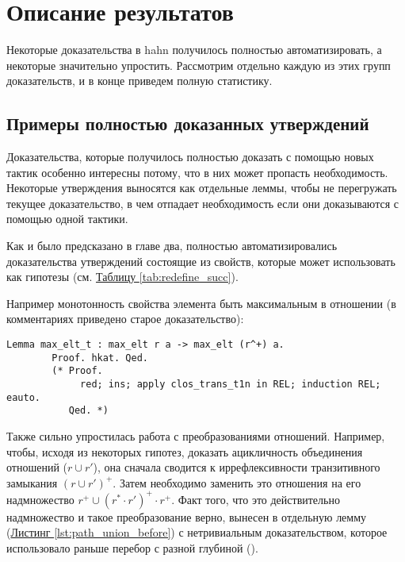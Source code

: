 \documentclass[times
              ,specification
              ,annotation
              ]{itmo-student-thesis}
\begin{document}
  \section{Описание результатов}

  
    Некоторые доказательства в hahn получилось полностью автоматизировать, а некоторые значительно
    упростить. Рассмотрим отдельно каждую из этих групп доказательств, и в конце приведем полную
    статистику.

    \subsection{Примеры полностью доказанных утверждений}

      Доказательства, которые получилось полностью доказать с помощью новых тактик особенно интересны
      потому, что в них может пропасть необходимость. Некоторые утверждения выносятся как отдельные
      леммы, чтобы не перегружать текущее доказательство, в чем отпадает необходимость если они
      доказываются с помощью одной тактики.

      Как и было предсказано в главе два, полностью автоматизировались доказательства утверждений
      состоящие из свойств, которые  может использовать как гипотезы
      (см. \hyperref[tab:redefine_succ]{Таблицу \ref{tab:redefine_succ}}).

      Например монотонность свойства элемента быть максимальным в отношении (в комментариях приведено
      старое доказательство):
      \begin{lstlisting}[float=false, gobble=8]
        Lemma max_elt_t : max_elt r a -> max_elt (r^+) a.
        Proof. hkat. Qed.
        (* Proof.
             red; ins; apply clos_trans_t1n in REL; induction REL; eauto.
           Qed. *)
      \end{lstlisting}

      Также сильно упростилась работа с преобразованиями отношений.
      Например, чтобы, исходя из некоторых гипотез, доказать ацикличность объединения
      отношений ($r \cup r'$), она сначала сводится к иррефлексивности транзитивного замыкания
      $(r \cup r')^+$.
      Затем необходимо заменить это отношения на его надмножество $r^+ \cup (r^* \cdot r')^+ \cdot r^+$.
      Факт того, что это действительно надмножество и такое преобразование
      верно, вынесен в отдельную лемму  (\hyperref[lst:path_union_before]{Листинг \ref{lst:path_union_before}})
      с нетривиальным доказательством, которое использовало раньше перебор с разной глубиной
      ().
\end{document}
